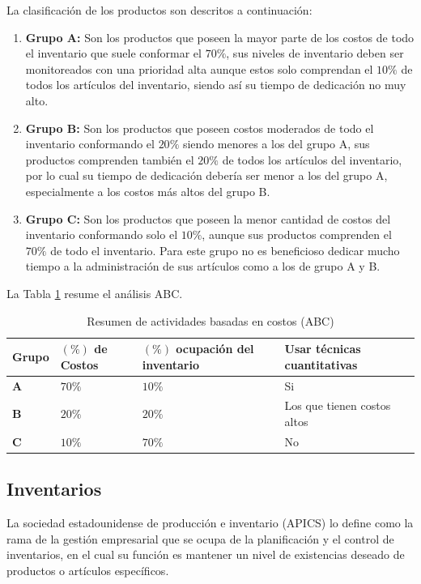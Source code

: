 La clasificación de los productos son descritos a continuación:
\begin{enumerate}
	\item \textbf{Grupo A:} Son los productos que poseen la mayor parte de los costos de todo el inventario que suele conformar el $70\%$, sus niveles de inventario deben ser monitoreados con una prioridad alta aunque estos solo comprendan el $10\%$ de todos los artículos del inventario, siendo así su tiempo de dedicación no muy alto.
	\item \textbf{Grupo B:} Son los productos que poseen costos moderados de todo el inventario conformando el $20\%$ siendo menores a los del grupo A, sus productos comprenden también el $20\%$ de todos los artículos del inventario, por lo cual su tiempo de dedicación debería ser menor a los del grupo A, especialmente a los costos más altos del grupo B.
	\item \textbf{Grupo C:} Son los productos que poseen la menor cantidad de costos del inventario conformando solo el $10\%$, aunque sus productos comprenden el $70\%$ de todo el inventario. Para este grupo no es beneficioso dedicar mucho tiempo a la administración de sus artículos como a los de grupo A y B.
\end{enumerate} 
La Tabla \ref{table:ABC_resumen} resume el análisis ABC.
\begin{table}[h!]
    \caption{Resumen de actividades basadas en costos (ABC)}
    \begin{tabular}{p{0.8cm} p{2.52cm} p{5.2cm} p{4.9cm}} %
        \hline
        \textbf{Grupo} & \textbf{$(\%)$ de Costos} & \textbf{$(\%)$ ocupación del inventario} & \textbf{Usar técnicas cuantitativas} \\
        \hline
        \textbf{A} & $70\%$ & $10\%$ & Si \\
        \textbf{B} & $20\%$ & $20\%$ & Los que tienen costos altos \\
        \textbf{C} & $10\%$ & $70\%$ & No \\
        \hline
    \end{tabular}
    \label{table:ABC_resumen}
\end{table}


\subsection{Inventarios}
La sociedad estadounidense de producción e inventario (APICS) lo define como la rama de la gestión empresarial que se ocupa de la planificación y el control de inventarios, en el cual su función es mantener un nivel de existencias deseado de productos o artículos específicos. \citep{toomey2000inventory}

